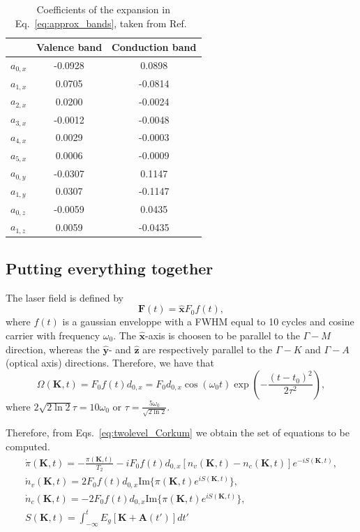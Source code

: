 \documentclass[a4paper,11pt]{report}
\renewcommand{\vec}[1]{\mathbf{#1}}
\begin{document}
\begin{table}
\centering
\begin{tabular}{lcc}
  \hline\hline
   & Valence band & Conduction band \\
  \hline
  $a_{0,x}$ &  -0.0928 &  0.0898 \\
  $a_{1,x}$ &   0.0705 & -0.0814 \\
  $a_{2,x}$ &   0.0200 & -0.0024 \\
  $a_{3,x}$ &  -0.0012 & -0.0048 \\
  $a_{4,x}$ &   0.0029 & -0.0003 \\
  $a_{5,x}$ &   0.0006 & -0.0009 \\
  $a_{0,y}$ &  -0.0307 &  0.1147 \\
  $a_{1,y}$ &   0.0307 & -0.1147 \\
  $a_{0,z}$ &  -0.0059 &  0.0435 \\
  $a_{1,z}$ &   0.0059 & -0.0435 \\
  \hline
\end{tabular}
\caption{Coefficients of the expansion in Eq.~\ref{eq:approx_bands}, taken from Ref.~\cite{PhysRevB.91.064302}}
\label{tab:bands_param}
\end{table}



\subsection{Putting everything together}
The laser field is defined  by 
\begin{equation}
 \vec{F}(t) = \vec{\hat{x}}F_0f(t),\nonumber
\end{equation}
where $f(t)$ is a gaussian enveloppe with a FWHM equal to 10 cycles and cosine carrier with frequency $\omega_0$. The $\vec{\hat{x}}$-axis is choosen to be parallel to the $\Gamma-M$ direction, whereas the $\vec{\hat{y}}$- and $\vec{\hat{z}}$ are respectively parallel to the $\Gamma-K$ and $\Gamma-A$ (optical axis) directions.
Therefore, we have that
\begin{equation}
 \Omega(\vec{K},t) = F_0f(t)d_{0,x} = F_0d_{0,x}\cos(\omega_0t)\exp(-\frac{(t-t_0)^2}{2\tau^2}),
\end{equation}
where $2\sqrt{2\ln{2}}\tau = 10\omega_0$ or $\tau = \frac{5\omega_0}{\sqrt{2\ln{2}}}$.


Therefore, from Eqs.~\ref{eq:twolevel_Corkum} we obtain the set of equations to be computed.
\begin{subequations}
 \begin{align}
 \dot{\pi}(\vec{K},t) = -\frac{\pi(\vec{K},t)}{T_2} - i F_0f(t)d_{0,x}[n_v(\vec{K},t)-n_c(\vec{K},t)]e^{-iS(\vec{K},t)}, \\
 \dot{n}_v(\vec{K},t) = 2 F_0f(t)d_{0,x}\mathrm{Im}\{\pi(\vec{K},t)e^{iS(\vec{K},t)}\}, \\
 \dot{n}_c(\vec{K},t) = -2 F_0f(t)d_{0,x}\mathrm{Im}\{\pi(\vec{K},t)e^{iS(\vec{K},t)}\},\\
 S(\vec{K},t) = \int_{-\infty}^t E_{g}[\vec{K}+\vec{A}(t')]dt'
 \end{align}
  \label{eq:twolevel_Corkum_real}
\end{subequations}
\end{document}
